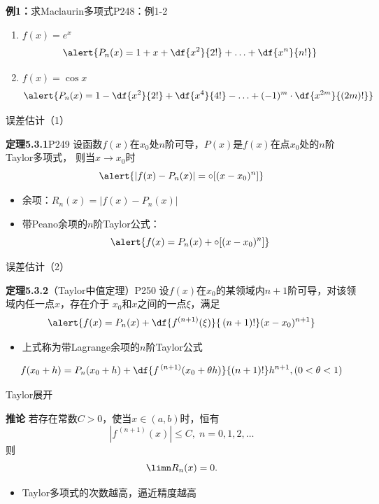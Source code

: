 \begin{frame}
	\linespread{1.2}
	\begin{exampleblock}{{\bf 例1：}求Maclaurin多项式\hfill P248：例1-2}
		\begin{enumerate}\pause 
		  \item $f(x)=e^x$\pause 
		  $$\alert{P_n(x)=1+x+\df{x^2}{2!}+\ldots+\df{x^n}{n!}}$$\pause 
		  \item $f(x)=\cos x$\pause 
		  $$\alert{P_n(x)=1-\df{x^2}{2!}+\df{x^4}{4!}-\ldots+(-1)^m\cdot\df{x^{2m}}{(2m)!}}$$
		\end{enumerate}
	\end{exampleblock}
\end{frame}

\begin{frame}{误差估计{\small（1）}}
	\linespread{1.2}\pause 
	\begin{block}{{\bf 定理5.3.1}\hfill P249}
		设函数$f(x)$在$x_0$处$n$阶可导，$P(x)$是$f(x)$在点$x_0$处的$n$阶Taylor多项式，
		则当$x\to x_0$时
		$$\alert{|f(x)-P_n(x)|=\circ[(x-x_0)^n]}$$
	\end{block}\pause 
	\begin{itemize}
	  \item {\bb 余项：}$R_n(x)=|f(x)-P_n(x)|$\pause 
	  \item {\bb 带Peano余项的$n$阶Taylor公式：}
	  $$\alert{f(x)=P_n(x)+\circ[(x-x_0)^n]}$$
	\end{itemize}
\end{frame}

\begin{frame}{误差估计{\small（2）}}
	\linespread{1.2}\pause 
	\begin{block}{{\bf 定理5.3.2}（Taylor中值定理）\hfill P250}
		设$f(x)$在$x_0$的某领域内$n+1$阶可导，对该领域内任一点$x$，存在介于
		$x_0$和$x$之间的一点$\xi$，满足
		$$\alert{f(x)=P_n(x)+\df{f^{(n+1)}(\xi)}{\,(n+1)!}(x-x_0)^{n+1}}$$
	\end{block}\pause 
	\begin{itemize}
	  \item 上式称为{\bb 带Lagrange余项的$n$阶Taylor公式}\pause 
	\end{itemize}
	\alert{$$f(x_0+h)=P_n(x_0+h)+\df{f^{\,(n+1)}(x_0+\theta
	h)}{(n+1)!}h^{n+1},(0<\theta<1)$$}
\end{frame}

\begin{frame}{Taylor展开}
	\linespread{1.2}\pause 
	\begin{block}{{\bf 推论}\hfill}
		若存在常数$C>0$，使当$x\in(a,b)$时，恒有
		$$|f^{\,(n+1)}(x)|\leq C,\;n=0,1,2,\ldots$$
		则
		$$\limn R_n(x)=0.$$
	\end{block}\pause 
	\begin{itemize}
	  \item \alert{Taylor多项式的次数越高，逼近精度越高}
	\end{itemize}
\end{frame}

